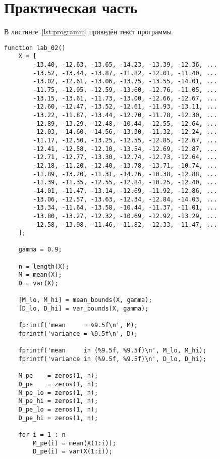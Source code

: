\chapter{Практическая часть}

\lstset{language=matlab}

В листинге~\ref{lst:programm} приведён текст программы.
\begin{lstlisting}[caption={Текст программы},label={lst:programm}]
function lab_02()
    X = [
        -13.40, -12.63, -13.65, -14.23, -13.39, -12.36, ...
        -13.52, -13.44, -13.87, -11.82, -12.01, -11.40, ...
        -13.02, -12.61, -13.06, -13.75, -13.55, -14.01, ...
        -11.75, -12.95, -12.59, -13.60, -12.76, -11.05, ...
        -13.15, -13.61, -11.73, -13.00, -12.66, -12.67, ...
        -12.60, -12.47, -13.52, -12.61, -11.93, -13.11, ...
        -13.22, -11.87, -13.44, -12.70, -11.78, -12.30, ...
        -12.89, -13.29, -12.48, -10.44, -12.55, -12.64, ...
        -12.03, -14.60, -14.56, -13.30, -11.32, -12.24, ...
        -11.17, -12.50, -13.25, -12.55, -12.85, -12.67, ...
        -12.41, -12.58, -12.10, -13.54, -12.69, -12.87, ...
        -12.71, -12.77, -13.30, -12.74, -12.73, -12.64, ...
        -12.18, -11.20, -12.40, -13.78, -13.71, -10.74, ...
        -11.89, -13.20, -11.31, -14.26, -10.38, -12.88, ...
        -11.39, -11.35, -12.55, -12.84, -10.25, -12.40, ...
        -14.01, -11.47, -13.14, -12.69, -11.92, -12.86, ...
        -13.06, -12.57, -13.63, -12.34, -12.84, -14.03, ...
        -13.34, -11.64, -13.58, -10.44, -11.37, -11.01, ...
        -13.80, -13.27, -12.32, -10.69, -12.92, -13.29, ...
        -12.58, -13.98, -11.46, -11.82, -12.33, -11.47, ...
    ];

    gamma = 0.9;

    n = length(X);
    M = mean(X);
    D = var(X);

    [M_lo, M_hi] = mean_bounds(X, gamma);
    [D_lo, D_hi] = var_bounds(X, gamma);

    fprintf('mean     = %9.5f\n', M);
    fprintf('variance = %9.5f\n', D);

    fprintf('mean     in (%9.5f, %9.5f)\n', M_lo, M_hi);
    fprintf('variance in (%9.5f, %9.5f)\n', D_lo, D_hi);

    M_pe    = zeros(1, n);
    D_pe    = zeros(1, n);
    M_pe_lo = zeros(1, n);
    M_pe_hi = zeros(1, n);
    D_pe_lo = zeros(1, n);
    D_pe_hi = zeros(1, n);

    for i = 1 : n
        M_pe(i) = mean(X(1:i));
        D_pe(i) = var(X(1:i));


\end{lstlisting}

